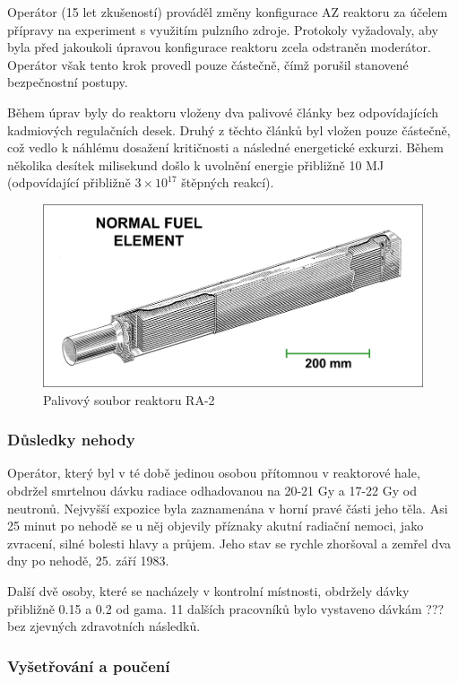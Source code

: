Operátor (15 let zkušeností) prováděl změny konfigurace AZ reaktoru za účelem přípravy na experiment s využitím pulzního zdroje. Protokoly vyžadovaly, aby byla před jakoukoli úpravou konfigurace reaktoru zcela odstraněn moderátor. Operátor však tento krok provedl pouze částečně, čímž porušil stanovené bezpečnostní postupy. 

Během úprav byly do reaktoru vloženy dva palivové články bez odpovídajících kadmiových regulačních desek. Druhý z těchto článků byl vložen pouze částečně, což vedlo k náhlému dosažení kritičnosti a následné energetické exkurzi. Během několika desítek milisekund došlo k uvolnění energie přibližně 10 MJ (odpovídající přibližně $3 \times 10^{17}$ štěpných reakcí).

\begin{figure}[H]
    \centering
    \includegraphics[width=0.75\linewidth]{img/PS_RA2.png}
    \caption{Palivový soubor reaktoru RA-2}
    \label{fig:enter-label}
\end{figure}

\subsubsection*{Důsledky nehody}

Operátor, který byl v té době jedinou osobou přítomnou v reaktorové hale, obdržel smrtelnou dávku radiace odhadovanou na 20-21 Gy a 17-22 Gy od neutronů. Nejvyšší expozice byla zaznamenána v horní pravé části jeho těla. Asi 25 minut po nehodě se u něj objevily příznaky akutní radiační nemoci, jako zvracení, silné bolesti hlavy a průjem. Jeho stav se rychle zhoršoval a zemřel dva dny po nehodě, 25. září 1983.

Další dvě osoby, které se nacházely v kontrolní místnosti, obdržely dávky přibližně 0.15 a 0.2 od gama. 11 dalších pracovníků bylo vystaveno dávkám ??? bez zjevných zdravotních následků.

\subsubsection*{Vyšetřování a poučení}

